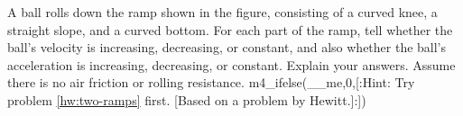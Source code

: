  A ball rolls down the ramp shown in the figure,
consisting of a curved knee, a straight slope, and a curved
bottom. For each part of the ramp, tell whether the ball's
velocity is increasing, decreasing, or constant, and also
whether the ball's acceleration is increasing, decreasing,
or constant. Explain your answers. Assume there is no air
friction or rolling resistance. m4_ifelse(__me,0,[:Hint: Try problem \ref{hw:two-ramps} first.
[Based on a problem by Hewitt.]:])
